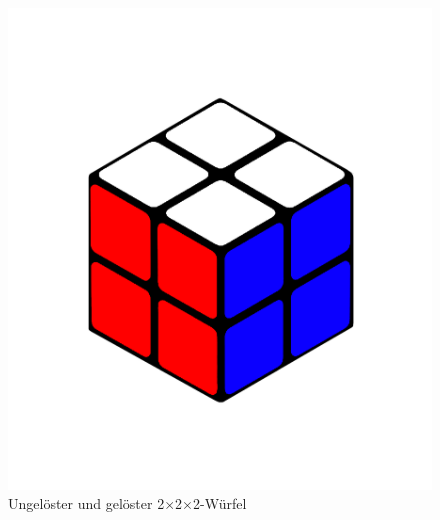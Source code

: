 \documentclass[12pt,a4paper, usenames, dvipsnames]{article}
\theoremstyle{mystyle}
\theoremstyle{definition}
\newcommand{\Ttwo}{2$\times$2$\times$2-}
\begin{document}
\begin{description}
\begin{figure}[h]
\includegraphics[scale=0.1]{2x2solved.png}
\caption[Ungelöster und gelöster \Ttwo Würfel]{Ungelöster und gelöster \Ttwo Würfel}
\label{Abbildung_WürfelUngelöstGelöst}
\end{figure}



\end{description}
\end{document}
